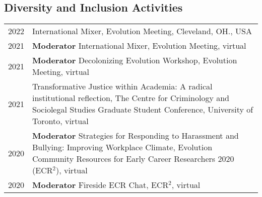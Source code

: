 \documentclass[11pt]{article}
\begin{document}
\subsection*{Diversity and Inclusion Activities}
\begin{longtable}{p{}  p{}}
2022& International Mixer, Evolution Meeting, Cleveland, OH., USA\\
2021& \textbf{Moderator} International Mixer, Evolution Meeting, virtual\\
2021& \textbf{Moderator} Decolonizing Evolution Workshop, Evolution Meeting, virtual\\
2021 & Transformative Justice within Academia: A radical institutional reflection, The Centre for Criminology and Sociolegal Studies Graduate Student Conference, University of Toronto, virtual\\
2020 &	\textbf{Moderator} Strategies for Responding to Harassment and Bullying: Improving Workplace Climate, Evolution Community Resources for Early Career Researchers 2020 (ECR$^2$), virtual\\
2020 &	\textbf{Moderator} Fireside ECR Chat, ECR$^2$, virtual\\
\end{longtable}
\end{document}
